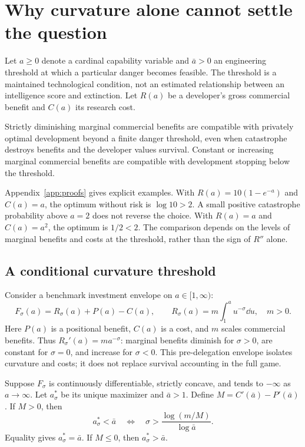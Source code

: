\section{Why curvature alone cannot settle the question}\label{sec:curvature}
Let $a\geq0$ denote a cardinal capability variable and $\bar a>0$ an engineering threshold at which a particular danger becomes feasible. The threshold is a maintained technological condition, not an estimated relationship between an intelligence score and extinction. Let $R(a)$ be a developer's gross commercial benefit and $C(a)$ its research cost.

\begin{proposition}[Counterexamples]\label{prop:counter}
Strictly diminishing marginal commercial benefits are compatible with privately optimal development beyond a finite danger threshold, even when catastrophe destroys benefits and the developer values survival. Constant or increasing marginal commercial benefits are compatible with development stopping below the threshold.
\end{proposition}

Appendix~\ref{app:proofs} gives explicit examples. With $R(a)=10(1-e^{-a})$ and $C(a)=a$, the optimum without risk is $\log 10>2$. A small positive catastrophe probability above $a=2$ does not reverse the choice. With $R(a)=a$ and $C(a)=a^2$, the optimum is $1/2<2$. The comparison depends on the levels of marginal benefits and costs at the threshold, rather than the sign of $R''$ alone.

\subsection{A conditional curvature threshold}
Consider a benchmark investment envelope on $a\in[1,\infty)$:
\begin{equation}\label{eq:envelope}
 F_\sigma(a)=R_\sigma(a)+P(a)-C(a),\qquad
 R_\sigma(a)=m\int_1^a u^{-\sigma}\dd u,\quad m>0.
\end{equation}
Here $P(a)$ is a positional benefit, $C(a)$ is a cost, and $m$ scales commercial benefits. Thus $R_\sigma'(a)=ma^{-\sigma}$: marginal benefits diminish for $\sigma>0$, are constant for $\sigma=0$, and increase for $\sigma<0$. This pre-delegation envelope isolates curvature and costs; it does not replace survival accounting in the full game.

\begin{proposition}\label{prop:static}
Suppose $F_\sigma$ is continuously differentiable, strictly concave, and tends to $-\infty$ as $a\to\infty$. Let $a_\sigma^*$ be its unique maximizer and $\bar a>1$. Define $M=C'(\bar a)-P'(\bar a)$. If $M>0$, then
\begin{equation}\label{eq:sigmathreshold}
 a_\sigma^*<\bar a\quad\Longleftrightarrow\quad
 \sigma>\frac{\log(m/M)}{\log\bar a}.
\end{equation}
Equality gives $a_\sigma^*=\bar a$. If $M\leq0$, then $a_\sigma^*>\bar a$.
\end{proposition}

